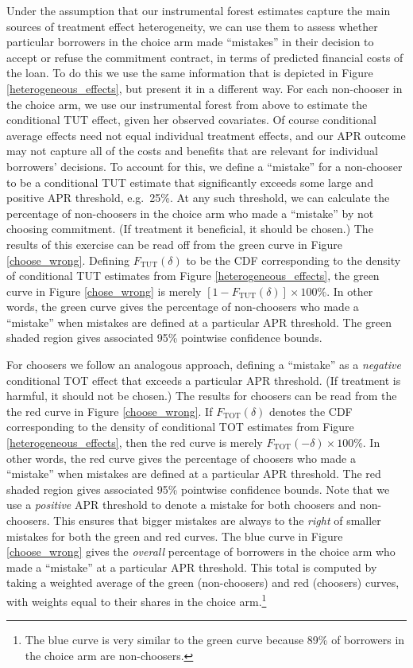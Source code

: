 \documentclass[oneside,11pt]{article}
\begin{document}
Under the assumption that our instrumental forest estimates capture the main sources of treatment effect heterogeneity, we can use them to assess whether particular borrowers in the choice arm made ``mistakes'' in their decision to accept or refuse the commitment contract, in terms of predicted financial costs of the loan.
To do this we use the same information that is depicted in Figure \ref{heterogeneous_effects}, but present it in a different way.
For each non-chooser in the choice arm, we use our instrumental forest from above to estimate the conditional TUT effect, given her observed covariates.
Of course conditional average effects need not equal individual treatment effects, and our APR outcome may not capture all of the costs and benefits that are relevant for individual borrowers' decisions.
To account for this, we define a ``mistake'' for a non-chooser to be a conditional TUT estimate that significantly exceeds some large and positive APR threshold, e.g.\ 25\%. 
At any such threshold, we can calculate the percentage of non-choosers in the choice arm who made a ``mistake'' by not choosing commitment.   
(If treatment it beneficial, it should be chosen.)
The results of this exercise can be read off from the green curve in Figure \ref{choose_wrong}.
Defining $F_{\text{TUT}}(\delta)$ to be the CDF corresponding to the density of conditional TUT estimates from Figure \ref{heterogeneous_effects}, the green curve in Figure \ref{chose_wrong} is merely $[1 - F_{\text{TUT}}(\delta)] \times 100\%$.
In other words, the green curve gives the percentage of non-choosers who made a ``mistake'' when mistakes are defined at a particular APR threshold.
The green shaded region gives associated 95\% pointwise confidence bounds.

For choosers we follow an analogous approach, defining a ``mistake'' as a \emph{negative} conditional TOT effect that exceeds a particular APR threshold.
(If treatment is harmful, it should not be chosen.)
The results for choosers can be read from the the red curve in Figure \ref{choose_wrong}.
If $F_{\text{TOT}}(\delta)$ denotes the CDF corresponding to the density of conditional TOT estimates from Figure \ref{heterogeneous_effects}, then the red curve is merely $F_{\text{TOT}}(-\delta) \times 100\%$.
In other words, the red curve gives the percentage of choosers who made a ``mistake'' when mistakes are defined at a particular APR threshold.
The red shaded region gives associated 95\% pointwise confidence bounds.
Note that we use a \emph{positive} APR threshold to denote a mistake for both choosers and non-choosers. 
This ensures that bigger mistakes are always to the \emph{right} of smaller mistakes for both the green and red curves.
The blue curve in Figure \ref{choose_wrong} gives the \emph{overall} percentage of borrowers in the choice arm who made a ``mistake'' at a particular APR threshold.
This total is computed by taking a weighted average of the green (non-choosers) and red (choosers) curves, with weights equal to their shares in the choice arm.\footnote{The blue curve is very similar to the green curve because 89\% of borrowers in the choice arm are non-choosers.}
\end{document}
